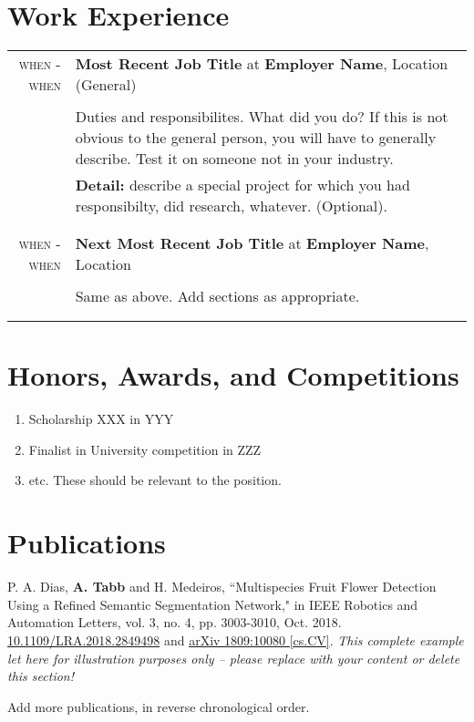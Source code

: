 \documentclass[a4paper,11pt]{article}
\newcommand{\job}[2]{\large\sffamily \textbf{#1} at \textbf{#2}}
\newcommand{\sep}{\multicolumn{2}{c}{}\\}
\begin{document}
\section{Work Experience}
\begin{longtable}{r|p{}}
  \textsc{when - when} & \job{Most Recent Job Title}{Employer Name}, Location (General) \\
    &\\
    &Duties and responsibilites.  What did you do?  If this is not obvious to the general person, you will have to generally describe. Test it on someone not in your industry.  \\
    &{\bf Detail:} describe a special project for which you had responsibilty, did research, whatever. (Optional).\\\sep
  
  \hline
  \sep
  
  \textsc{when - when} & \job{Next Most Recent Job Title}{Employer Name}, Location \\
    &\\
    &Same as above.  Add sections as appropriate.\\\sep
   \hline
  \sep
\end{longtable}

\section{Honors, Awards, and Competitions}
\begin{enumerate}[noitemsep, leftmargin=*,label={}]
	\item{Scholarship XXX in YYY }
	\item{Finalist in University competition in ZZZ}
	\item{etc.  These should be relevant to the position.}
\end{enumerate}

\section{Publications}
\begin{enumerate}[noitemsep, leftmargin=*,label={[\arabic*]}]
\item{P. A. Dias, \textbf{A. Tabb} and H. Medeiros, ``Multispecies Fruit Flower Detection Using a Refined Semantic Segmentation Network," in IEEE Robotics and Automation Letters, vol. 3, no. 4, pp. 3003-3010, Oct. 2018.\\ \href{https://doi.org/10.1109/LRA.2018.2849498}{10.1109/LRA.2018.2849498} and \href{https://arxiv.org/abs/1809.10080}{arXiv 1809:10080 [cs.CV]}. {\it This complete example let here for illustration purposes only -- please replace with your content or delete this section!}}
\item{Add more publications, in reverse chronological order.}
\end{enumerate}
\end{document}

